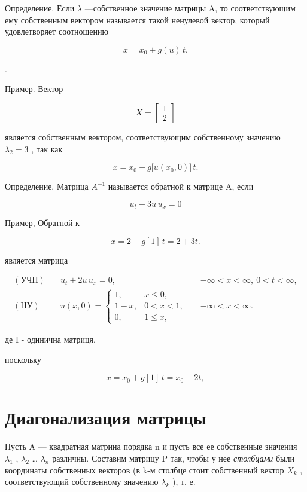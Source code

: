 \documentclass[
  ukrainian,
]{article}
\begin{document}
Определение. Если \(\lambda\) ---собственное значение матрицы A, то
соответствующим ему собственным вектором называется такой ненулевой
вектор, который удовлетворяет соотношению

\[
x = x_0 + g(u)\,t.
\]

.

Пример. Вектор

\[
X = \begin{bmatrix} 1 \\ 2 \end{bmatrix}
\]

является собственным вектором, соответствующим собственному значению
\(\lambda_2 = 3\) , так как

\[
x = x_0 + g\!\bigl[u(x_0,0)\bigr]\,t.
\]

Определение. Матрица \(A^{-1}\) называется обратной к матрице A, если

\[
u_t + 3u\,u_x = 0
\]

Пример, Обратной к

\[
x = 2 + g[1]\,t = 2 + 3t.
\]

является матрица

\[
\begin{aligned}
(\text{УЧП})\quad & u_t + 2u\,u_x = 0, && -\infty < x < \infty,\ 0 < t < \infty, \\
(\text{НУ})\quad &
u(x,0)=
\begin{cases}
1, & x \le 0,\\
1-x, & 0 < x < 1,\\
0, & 1 \le x,
\end{cases}
&& -\infty < x < \infty.
\end{aligned}
\]

де I - одинична матриця.

поскольку

\[
x = x_0 + g[1]\,t = x_0 + 2t,
\]

\section{Диагонализация
матрицы}\label{ux434ux438ux430ux433ux43eux43dux430ux43bux438ux437ux430ux446ux438ux44f-ux43cux430ux442ux440ux438ux446ux44b-1}

Пусть A --- квадратная матрина порядка n и пусть все ее собственные
значения \(\lambda_1\) , \(\lambda_2\) \ldots{} \(\lambda_n\) различны.
Составим матрицу P так, чтобы у нее \emph{столбцами} были координаты
собственных векторов (в k-м столбце стоит собственный вектор \(X_k\) ,
соответствующий собственному значению \(\lambda_k\) ), т. е.
\end{document}
